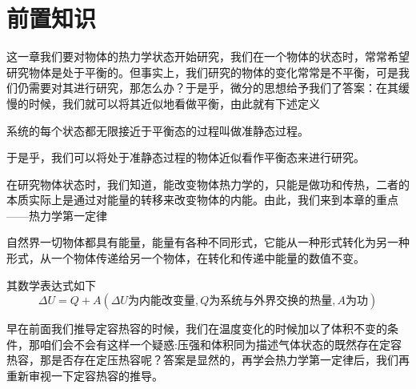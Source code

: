 \documentclass[lang=cn,10pt]{elegantbook}
\begin{document}
	\section{前置知识}
	这一章我们要对物体的热力学状态开始研究，我们在一个物体的状态时，常常希望研究物体是处于平衡的。但事实上，我们研究的物体的变化常常是不平衡，可是我们仍需要对其进行研究，那怎么办？于是乎，微分的思想给予我们了答案：在其缓慢的时候，我们就可以将其近似地看做平衡，由此就有下述定义
	\begin{definition}[准静态过程]
		系统的每个状态都无限接近于平衡态的过程叫做准静态过程。
	\end{definition}
	于是乎，我们可以将处于准静态过程的物体近似看作平衡态来进行研究。
	
	在研究物体状态时，我们知道，能改变物体热力学的，只能是做功和传热，二者的本质实际上是通过对能量的转移来改变物体的内能。由此，我们来到本章的重点——热力学第一定律
	
	\begin{theorem}[热力学第一定律]
		自然界一切物体都具有能量，能量有各种不同形式，它能从一种形式转化为另一种形式，从一个物体传递给另一个物体，在转化和传递中能量的数值不变。
	\end{theorem}
	其数学表达式如下
	\begin{equation*}
		\varDelta U=Q+A (\varDelta U\text{为内能改变量},Q\text{为系统与外界交换的热量},A\text{为功})
	\end{equation*}
	
	早在前面我们推导定容热容的时候，我们在温度变化的时候加以了体积不变的条件，那咱们会不会有这样一个疑惑:压强和体积同为描述气体状态的既然存在定容热容，那是否存在定压热容呢？答案是显然的，再学会热力学第一定律后，我们再重新审视一下定容热容的推导。
	
\end{document}
